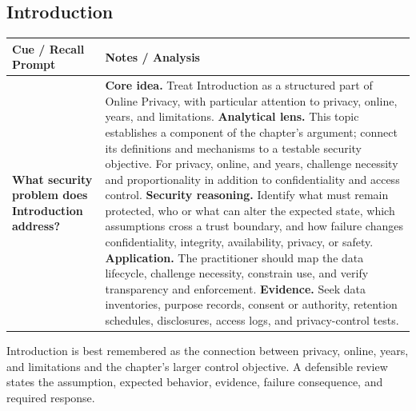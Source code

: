 \documentclass[11pt]{article}
\newcommand{\CornellHeader}{%
\rowcolor{Navy}\color{white}\bfseries Cue / Recall Prompt & \color{white}\bfseries Notes / Analysis\\\hline}
\newcommand{\CornellRow}[2]{%
\cellcolor{CueGray}\RaggedRight\textbf{#1} & \RaggedRight #2\\\hline}
\begin{document}
\subsection*{Introduction}
\begin{longtable}{>{\RaggedRight\arraybackslash}p{}|>{\RaggedRight\arraybackslash}p{}}
\CornellHeader
\CornellRow{What security problem does Introduction address?}{\textbf{Core idea.} Treat Introduction as a structured part of Online Privacy, with particular attention to privacy, online, years, and limitations. \textbf{Analytical lens.} This topic establishes a component of the chapter's argument; connect its definitions and mechanisms to a testable security objective. For privacy, online, and years, challenge necessity and proportionality in addition to confidentiality and access control. \textbf{Security reasoning.} Identify what must remain protected, who or what can alter the expected state, which assumptions cross a trust boundary, and how failure changes confidentiality, integrity, availability, privacy, or safety. \textbf{Application.} The practitioner should map the data lifecycle, challenge necessity, constrain use, and verify transparency and enforcement. \textbf{Evidence.} Seek data inventories, purpose records, consent or authority, retention schedules, disclosures, access logs, and privacy-control tests.}
\end{longtable}
\begin{topicsummary}
Introduction is best remembered as the connection between privacy, online, years, and limitations and the chapter's larger control objective. A defensible review states the assumption, expected behavior, evidence, failure consequence, and required response.
\end{topicsummary}
\end{document}
